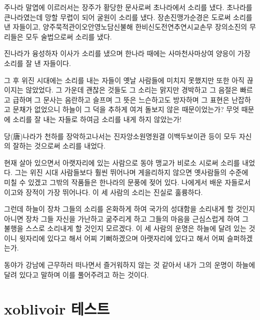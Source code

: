 \documentclass[demo,chapter,openany,amsmath,gremph]{oblivoir}
\begin{document}
주나라 말엽에 이르러서는 장주가 황당한 문사로써 초나라에서
소리를 냈다. 초나라를 큰나라였는데 망할 무렵이 되어 굴원이 소리를 냈다.
장손진\cntrdot 맹가\cntrdot 순경은 도로써 소리를 낸 자들이고,
양주\cntrdot 묵적\cntrdot 관이오\cntrdot 안영\cntrdot 노담\cntrdot 신불해\cntrdot 
한비\cntrdot 신도\cntrdot 전연\cntrdot 추연\cntrdot 시교\cntrdot 손무\cntrdot 
장의\cntrdot 소진의 무리들은 모두 술법으로써 소리를 냈다.

진나라가 융성하자 이사가 소리를 냈으며 한나라 때에는 사마천\cntrdot 사마상여\cntrdot 
양응이 가장 소리를 잘 낸 자들이다.

그 후 위\cntrdot 진 시대에는 소리를 내는 자들이 옛날 사람들에 미치지 못했지만
또한 아직 끊이지는 않았었다. 그 가운데 괜찮은 것들도 그 소리는 맑지만
경박하고 그 음절은 빠르고 급하며 그 문사는 음란하고 슬프며
그 뜻은 느슨하고도 방자하며 그 표현은 난잡하고 문채가 없었으니
하늘이 그 덕을 추하게 여겨 돌보지 않은 때문이었는가? 무엇 때문에
소리를 잘 내는 자들로 하여금 소리를 내게 하지 않았는가!

당(唐)나라가 천하를 장악하고나서는 진자앙\cntrdot 소원명\cntrdot 원결\cntrdot 
이백\cntrdot 두보\cntrdot 이관 등이 모두 자신의 잘하는 것으로써 소리를 내었다.

현재 살아 있으면서 아랫자리에 있는 사람으로 동야 맹교가 비로소 시로써
소리를 내었다. 그는 위\cntrdot 진 시대 사람들보다 훨씬 뛰어나며
게을리하지 않으면 옛사람들의 수준에 미칠 수 있겠고
그밖의 작품들은 한나라의 문풍에 젖어 있다. 나에게서 배운 자들로서
이고와 장적이 가장 뛰어나다. 이 세 사람의 소리는 진실로 훌륭하다.

그런데 하늘이 장차 그들의 소리를 온화하게 하여 국가의 성대함을 소리내게
할 것인지 아니면 장차 그들 자신을 가난하고 굶주리게 하고
그들의 마음을 근심스럽게 하여 그 불행을 스스로 소리내게 할 것인지 모르겠다.
이 세 사람의 운명은 하늘에 달려 있는 것이니 윗자리에 있다고 해서 어찌
기뻐하겠으며 아랫자리에 있다고 해서 어찌 슬퍼하겠는가.

동야가 강남에 근무하러 떠나면서 즐거워하지 않는 것 같아서 내가 그의
운명이 하늘에 달려 있다고 말하며 이를 풀어주려고 하는 것이다.


\part{xoblivoir 테스트}

\pagestyle{companion}
\end{document}
